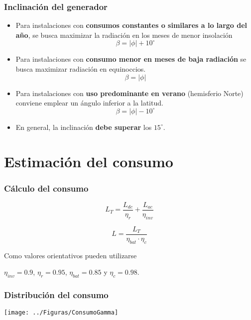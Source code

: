 \documentclass[serif, xcolor=dvipsnames]{beamer}
\begin{document}
\begin{frame}
\frametitle{Inclinación del generador}
\begin{itemize}
\item Para instalaciones con \textbf{consumos constantes o similares a lo
largo del año}, se busca maximizar la radiación en los meses de menor
insolación\[
\beta=|\phi|+10^{\circ}\]

\item Para instalaciones con \textbf{consumo menor en meses de baja radiación}
se busca maximizar radiación en equinoccios.\[
\beta=|\phi|\]

\item Para instalaciones con \textbf{uso predominante en verano} (hemisferio
Norte) conviene emplear un ángulo inferior a la latitud.\[
\beta=|\phi|-10^{\circ}\]

\item En general, la inclinación \textbf{debe superar} los $15^{\circ}$.
\end{itemize}

\end{frame}

\section{Estimación del consumo}


\begin{frame}
\frametitle{Cálculo del consumo}

\[
L_{T}=\frac{L_{dc}}{\eta_{r}}+\frac{L_{ac}}{\eta_{inv}}\]


\[
L=\frac{L_{T}}{\eta_{bat}\cdot\eta_{c}}\]


\begin{center}
Como valores orientativos pueden utilizarse
\par\end{center}

\begin{center}
$\eta_{inv}=0.9$, $\eta_{r}=0.95$, $\eta_{bat}=0.85$ y $\eta_{c}=0.98$.
\par\end{center}


\end{frame}

\begin{frame}[plain]
\frametitle{Distribución del consumo}

\texttt{[image: ../Figuras/ConsumoGamma]}


\end{frame}
\end{document}
